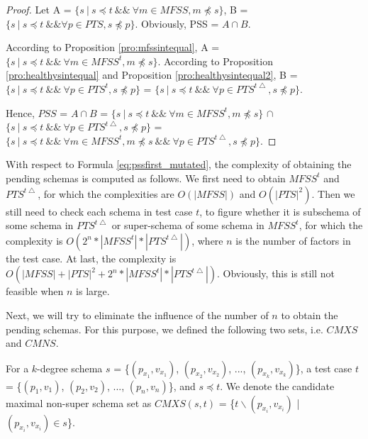 \begin{proof}

Let A = $\{ s\ |\  s \preceq t\ \&\&\ \forall m \in MFSS,  m \npreceq s \}$, B = $ \{ s\ |\ s \preceq t\ \&\&  \forall p \in PTS, s \npreceq p \} $. Obviously, PSS = $A \cap B$.

According to Proposition \ref{pro:mfssintequal}, A = $\{ s\ |\  s \preceq t\ \&\&\ \forall m \in MFSS^{t},  m \npreceq s \}$.
According to Proposition \ref{pro:healthysintequal} and Proposition \ref{pro:healthysintequal2}, B = $\{ s\ |\  s \preceq t\ \&\&\ \forall p \in PTS^{t},  s \npreceq p \}$ = $\{ s\ |\  s \preceq t\ \&\&\ \forall p \in PTS^{t\bigtriangleup},  s \npreceq p \}$.

Hence, $PSS$ = $A \cap B$ = $\{ s\ |\  s \preceq t\ \&\&\ \forall m \in MFSS^{t},  m \npreceq s \}$ $\cap$ $\{ s\ |\  s \preceq t\ \&\&\ \forall p \in PTS^{t\bigtriangleup},  s \npreceq p \}$ = $\{ s\ |\ s \preceq t\ \&\&\ \forall m \in MFSS^{t},  m \npreceq s  \ \&\&\  \forall p \in PTS^{t\bigtriangleup}, s \npreceq p \}$.
\end{proof}


With respect to Formula \ref{eq:pssfirst_mutated}, the complexity of obtaining the pending schemas is computed as follows. We first need to obtain $MFSS^{t}$ and $PTS^{t\bigtriangleup}$, for which the complexities are $O(|MFSS|)$ and $O(|PTS|^{2})$. Then we still need to check each schema in test case $t$, to figure whether it is subschema of some schema in $PTS^{t\bigtriangleup}$ or super-schema of some schema in $MFSS^{t}$, for which the complexity is $O(2^{n}* |MFSS^{t}| * |PTS^{t\bigtriangleup}|)$, where $n$ is the number of factors in the test case.  At last, the complexity is $O(|MFSS| + |PTS|^{2} + 2^{n}* |MFSS^{t}| * |PTS^{t\bigtriangleup}| )$. Obviously, this is still not feasible when $n$ is large.



Next, we will try to eliminate the influence of the number of $n$ to obtain the pending schemas. For this purpose, we defined the following two sets, i.e. $CMXS$ and $CMNS$.

\begin{definition}
For a $k$-degree schema $s$ = \{$(p_{x_{1}}, v_{x_{1}})$, $(p_{x_{2}}, v_{x_{2}})$, ..., $(p_{x_{k}}, v_{x_{k}})$\}, a test case $t$ = \{$(p_{1}, v_{1})$, $(p_{2}, v_{2})$, ..., $(p_{n}, v_{n})$\}, and $s \preceq t$. We denote the candidate maximal non-super schema set as $CMXS(s,t)$ = \{$t \backslash (p_{x_{i}}, v_{x_{i}})$ | $(p_{x_{i}}, v_{x_{i}}) \in s $\}.
\end{definition}

